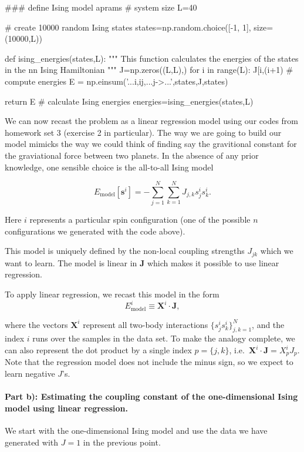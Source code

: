 \documentclass[%
oneside,                 %
final,                   %
10pt]{article}
\begin{document}
### define Ising model aprams
# system size
L=40

# create 10000 random Ising states
states=np.random.choice([-1, 1], size=(10000,L))

def ising_energies(states,L):
    """
    This function calculates the energies of the states in the nn Ising Hamiltonian
    """
    J=np.zeros((L,L),)
    for i in range(L):
        J[i,(i+1)%
    # compute energies
    E = np.einsum('...i,ij,...j->...',states,J,states)

    return E
# calculate Ising energies
energies=ising_energies(states,L)
\epycod

We can now recast the problem as a linear regression model using our codes from homework set 3 (exercise 2 in particular).
The way we are going to build our model mimicks the way we could think of finding say the gravitional constant for the graviational force between two planets.
In the absence of any prior knowledge, one sensible choice is the all-to-all Ising model

\[
E_\mathrm{model}[\boldsymbol{s}^i] = - \sum_{j=1}^N \sum_{k=1}^N J_{j,k}s_{j}^is_{k}^i.
\]

Here $i$ represents a particular spin configuration (one of the possible $n$ configurations we generated with the code above).

This model is uniquely defined by the non-local coupling strengths $J_{jk}$ which we want to learn.
The model is linear in $\mathbf{J}$ which makes it possible to use linear regression.

To apply linear regression, we recast this model in the form
\[
E_\mathrm{model}^i \equiv \mathbf{X}^i \cdot \mathbf{J},
\]

where the vectors $\mathbf{X}^i$ represent all two-body interactions
$\{s_{j}^is_{k}^i \}_{j,k=1}^N$, and the index $i$ runs over the
samples in the data set.  To make the analogy complete, we can also
represent the dot product by a single index $p = \{j,k\}$,
i.e.~$\mathbf{X}^i \cdot \mathbf{J}=X^i_pJ_p$.  Note that the
regression model does not include the minus sign, so we expect to
learn negative $J$'s.

\paragraph{Part b): Estimating the coupling constant of the one-dimensional Ising model using linear regression.}
We start with the one-dimensional Ising model and use the data we have
generated with $J=1$ in the previous point.
\end{document}
